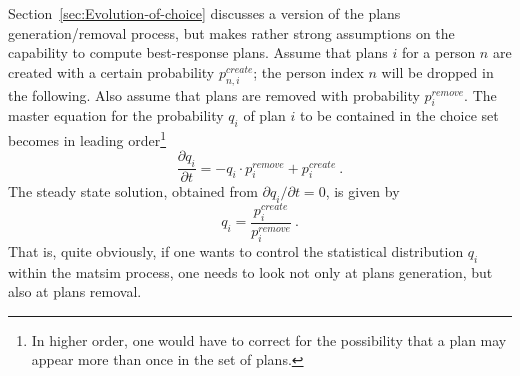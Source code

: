 Section~\ref{sec:Evolution-of-choice} discusses a version of the plans generation/removal process, but makes rather strong assumptions on the capability to compute best-response plans.  
Assume that plans $i$ for a person $n$ are created with a certain probability $p^{create}_{n,i}$; the person index $n$ will be dropped in the following.  Also assume that plans are removed with probability $p^{remove}_{i}$.  The master equation for the probability $q_{i}$ of plan $i$ to be contained in the choice set becomes in leading order\footnote{%
%
In higher order, one would have to correct for the possibility that a plan may appear more than once in the set of plans.
%
}
\[
\frac{\partial q_{i}}{\partial t}
%
= - q_{i} \cdot p^{remove}_{i} + p^{create}_{i} \ .
\]
The steady state solution, obtained from $\partial q_{i}/\partial t = 0$, is given by
\begin{equation}
q_{i} = \frac{p^{create}_{i}}{p^{remove}_{i}} \ .
\label{eq:5}
\end{equation}
That is, quite obviously, if one wants to control the statistical distribution $q_{i}$ within the \gls{matsim} process, one needs to look not only at plans generation, but also at plans removal.


